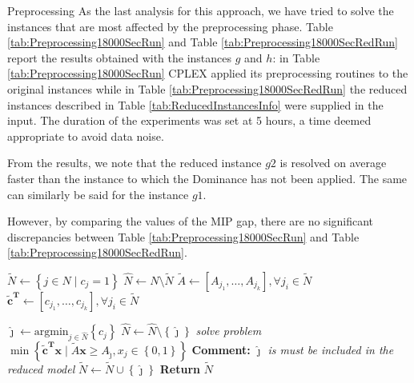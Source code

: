 \documentclass[a4paper,12pt]{mydeitesi_eng}
\begin{document}
\begin{chapter}{Preprocessing}
As the last analysis for this approach, we have tried to solve the instances that are most affected by the preprocessing phase.
Table \ref{tab:Preprocessing18000SecRun} and Table \ref{tab:Preprocessing18000SecRedRun} report the results obtained with the instances $g$ and $h$: in Table \ref{tab:Preprocessing18000SecRun} CPLEX applied its preprocessing routines to the original instances while in Table \ref{tab:Preprocessing18000SecRedRun} the reduced instances described in Table \ref{tab:ReducedInstancesInfo} were supplied in the input.
The duration of the experiments was set at 5 hours, a time deemed appropriate to avoid data noise.

From the results, we note that the reduced instance $g2$ is resolved on average faster than the instance to which the Dominance has not been applied.
The same can similarly be said for the instance $g1$.

However, by comparing the values of the MIP gap, there are no significant discrepancies between Table \ref{tab:Preprocessing18000SecRun} and Table \ref{tab:Preprocessing18000SecRedRun}.\\


\begin{algorithm}[h]

\AlgoDontDisplayBlockMarkers
\SetAlgoNoEnd
\DontPrintSemicolon
\LinesNumbered


\BlankLine

$\tilde{N} \gets \left\{j \in N \mid c_j = 1 \right\}$\;
$\hat{N} \gets N \setminus \tilde{N}$\;
$\tilde{A} \gets \left[ A_{j_1}, \dots, A_{j_k} \right], \forall j_i \in \tilde{N}$\;
$\mathbf{\tilde{c}^T} \gets \left[ c_{j_1}, \dots, c_{j_k} \right], \forall j_i \in \tilde{N}$\;

{
	$\hat{\jmath} \gets \text{argmin}_{j \in \hat{N}} \left\{ c_{j} \right\}$\;
	$\hat{N} \gets \hat{N} \setminus \left\{ \hat{\jmath} \right\}$\;
	\emph{solve problem} $\min \left\{ \mathbf{\tilde{c}^T x} \mid \tilde{A} \mathbf{x} \ge A_{\hat{\jmath}}, x_j \in \left\{0, 1\right\}\right\}$\;
	{
		\textbf{Comment:} \emph{$\hat{\jmath}$ is must be included in the reduced model}\;
		$\tilde{N} \gets \tilde{N} \cup \left\{ \hat{\jmath} \right\}$\;
	}
}
\textbf{Return }$\tilde{N}$\;
\BlankLine
\BlankLine


\end{algorithm}
\end{chapter}
\end{document}
